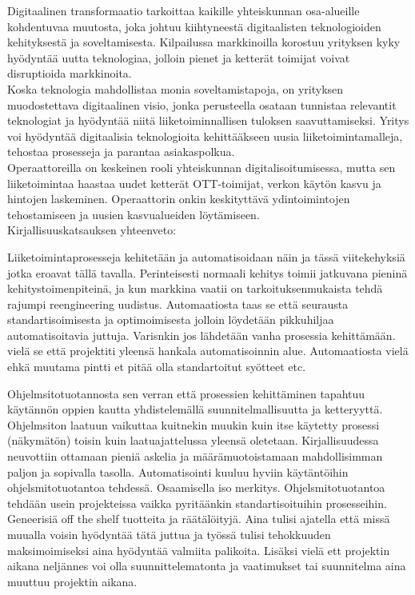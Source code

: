 \documentclass[finnish,12pt,a4paper,pdftex]{article}
\begin{document}
Digitaalinen transformaatio tarkoittaa kaikille yhteiskunnan osa-alueille kohdentuvaa muutosta, joka johtuu kiihtyneestä digitaalisten teknologioiden kehityksestä ja soveltamisesta. 
Kilpailussa markkinoilla korostuu yrityksen kyky hyödyntää uutta teknologiaa, jolloin pienet ja ketterät toimijat voivat disruptioida markkinoita.\\

Koska teknologia mahdollistaa monia soveltamistapoja, on yrityksen muodostettava digitaalinen visio, jonka perusteella osataan tunnistaa relevantit teknologiat ja hyödyntää niitä liiketoiminnallisen tuloksen saavuttamiseksi. Yritys voi hyödyntää digitaalisia teknologioita kehittääkseen uusia liiketoimintamalleja, tehostaa prosesseja ja parantaa asiakaspolkua.\\

Operaattoreilla on keskeinen rooli yhteiskunnan digitalisoitumisessa, mutta sen liiketoimintaa haastaa uudet ketterät OTT-toimijat, verkon käytön kasvu ja hintojen laskeminen. Operaattorin onkin keskityttävä ydintoimintojen tehostamiseen ja uusien kasvualueiden löytämiseen.\\


Kirjallisuuskatsauksen yhteenveto:

Liiketoimintaprosesseja kehitetään ja automatisoidaan näin ja tässä viitekehyksiä jotka eroavat tällä tavalla. Perinteisesti normaali kehitys toimii jatkuvana pieninä kehitystoimenpiteinä, ja kun markkina vaatii on tarkoituksenmukaista tehdä rajumpi reengineering uudistus. Automaatiosta taas se että seurausta standartisoimisesta ja optimoimisesta jolloin löydetään pikkuhiljaa automatisoitavia juttuja. Varisnkin jos lähdetään vanha prosessia kehittämään. vielä se että projektiti yleensä hankala automatisoinnin alue. Automaatiosta vielä ehkä muutama pintti et pitää olla standartoitut syötteet etc. 

Ohjelmsitotuotannosta sen verran että prosessien kehittäminen tapahtuu käytännön oppien kautta yhdistelemällä suunnitelmallisuutta ja ketteryyttä. Ohjelmsiton laatuun vaikuttaa kuitnekin muukin kuin itse käytetty prosessi (näkymätön) toisin kuin laatuajattelussa yleensä oletetaan. Kirjallisuudessa neuvottiin ottamaan pieniä askelia ja määrämuotoistamaan mahdollisimman paljon ja sopivalla tasolla. Automatisointi kuuluu hyviin käytäntöihin ohjelsmitotuotantoa tehdessä. Osaamisella iso merkitys. Ohjelsmitotuotantoa tehdään usein projekteissa vaikka pyritäänkin standartisoituihin prosesseihin. Geneerisiä off the shelf tuotteita ja räätälöityjä. Aina tulisi ajatella että missä muualla voisin hyödyntää tätä juttua ja työssä tulisi tehokkuuden maksimoimiseksi aina hyödyntää valmiita palikoita. Lisäksi vielä ett projektin aikana neljännes voi olla suunnittelematonta ja vaatimukset tai suunnitelma aina muuttuu projektin aikana.
\end{document}
